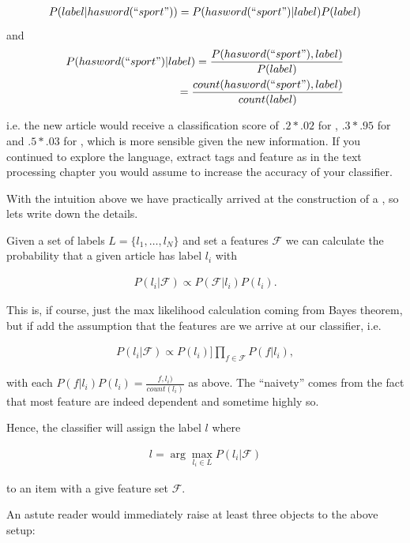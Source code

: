 \begin{align*}
    P(label|hasword(``sport")) = P(hasword(``sport")|label)P(label)
\end{align*}
and
\begin{align*}
    P(hasword(``sport")|label) = \frac{P(hasword(``sport"),label)}{P(label)} \\ = \frac{count(hasword(``sport"), label)}{count(label)} 
\end{align*}

i.e. the new article would receive a classification score of $.2*.02$ for , $.3*.95$ for  and $.5*.03$ for , which is more sensible given the new information. If you continued to explore the language, extract tags and feature as in the text processing chapter you would assume to increase the accuracy of your classifier. 


With the intuition above we have practically arrived at the construction of a , so lets write down the details. 

Given a set of labels $L = \{l_1, \dots, l_N\}$ and set a features $\mathcal{F}$ we can calculate the probability that a given article has label $l_i$ with

\begin{align*}
    P(l_i|\mathcal{F}) \propto P(\mathcal{F}|l_i)P(l_i).
\end{align*}

This is, if course, just the max likelihood calculation coming from Bayes theorem, but if add the assumption that the features are  we arrive at our classifier, i.e. 

\begin{align*}
    P(l_i|\mathcal{F}) \propto P(l_i)] \prod_{f \in \mathcal{F}} P(f|l_i),
\end{align*}

with each $P(f|l_i)P(l_i) = \frac{f, l_i)}{count(l_i)}$ as above. The ``naivety''  comes from the fact that most feature are indeed dependent and sometime highly so. 

Hence, the classifier will assign the label $l$ where  

\begin{align*}
    l = \arg \max_{l_i \in L}P(l_i|\mathcal{F}) 
\end{align*}

to an item with a give feature set $\mathcal{F}$.



An astute reader would immediately raise at least three objects to the above setup:

